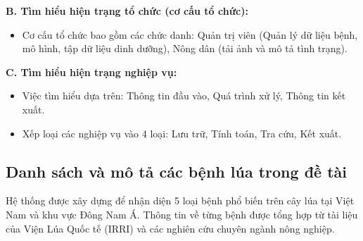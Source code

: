 \documentclass[12pt,a4paper]{article}
\begin{document}
\textbf{B. Tìm hiểu hiện trạng tổ chức (cơ cấu tổ chức):}
\begin{itemize}
    \item Cơ cấu tổ chức bao gồm các chức danh: Quản trị viên (Quản lý dữ liệu bệnh, mô hình, tập dữ liệu dinh dưỡng), Nông dân (tải ảnh và mô tả tình trạng).
\end{itemize}

\textbf{C. Tìm hiểu hiện trạng nghiệp vụ:}
\begin{itemize}
    \item Việc tìm hiểu dựa trên: Thông tin đầu vào, Quá trình xử lý, Thông tin kết xuất.
    \item Xếp loại các nghiệp vụ vào 4 loại: Lưu trữ, Tính toán, Tra cứu, Kết xuất.
\end{itemize}

\hrulefill

\subsection{Danh sách và mô tả các bệnh lúa trong đề tài}
Hệ thống được xây dựng để nhận diện 5 loại bệnh phổ biến trên cây lúa tại Việt Nam và khu vực Đông Nam Á. Thông tin về từng bệnh được tổng hợp từ tài liệu của Viện Lúa Quốc tế (IRRI) và các nghiên cứu chuyên ngành nông nghiệp.

\vspace{0.3cm}
\end{document}
